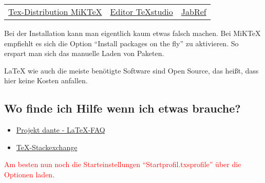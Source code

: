 \begin{center}
	\begin{tabular}{ccc}
	\href{https://miktex.org/}{Tex-Distribution MiKTeX} &
	\href{https://www.texstudio.org/}{Editor TeXstudio} &
	\href{http://www.jabref.org/}{JabRef} \\
\end{tabular}
\end{center}

Bei der Installation kann man eigentlich kaum etwas falsch machen. Bei MiKTeX empfiehlt es sich die Option "`Install packages on the fly"' zu aktivieren. So erspart man sich das manuelle Laden von Paketen. 

{\LaTeX} wie auch die meiste benötigte Software sind Open Source, das heißt, dass hier keine Kosten anfallen.

\subsection{Wo finde ich Hilfe wenn ich etwas brauche? 
	\label{sec:latex_hilfe}}
\begin{itemize}
	\item \href{http://projekte.dante.de/DanteFAQ/WebHome}{Projekt dante - \LaTeX -FAQ}
	\item \href{https://tex.stackexchange.com/}{TeX-Stackexchange}
\end{itemize}
\textcolor{red}{Am besten nun noch die Starteinstellungen "`Startprofil.txsprofile"' über die Optionen laden.}
\cleardoublepage
